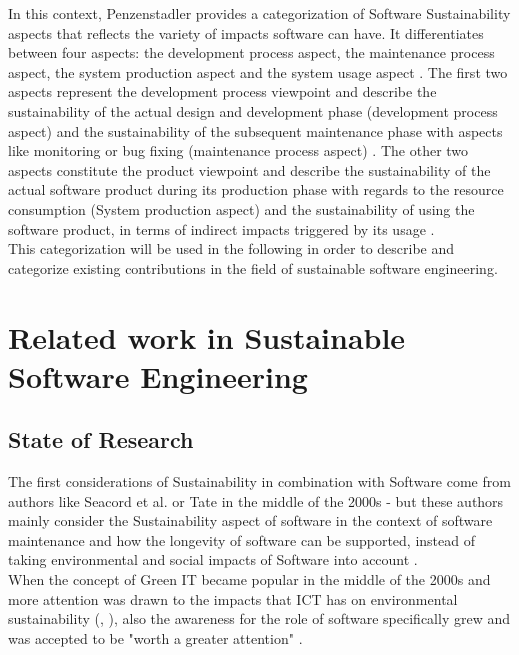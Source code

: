 \documentclass[oribibl]{llncs}
\begin{document}
In this context, Penzenstadler \cite{penzenstadler_supporting_2012} provides a categorization of Software Sustainability aspects that reflects the variety of impacts software can have. It differentiates between four aspects: the development process aspect, the maintenance process aspect, the system production aspect and the system usage aspect \cite{penzenstadler_supporting_2012}. The first two aspects represent the development process viewpoint and describe the sustainability of the actual design and development phase (development process aspect) and the sustainability of the subsequent maintenance phase with aspects like monitoring or bug fixing (maintenance process aspect) \cite{penzenstadler_sustainability_2012}. The other two aspects constitute the product viewpoint and describe the sustainability of the actual software product during its production phase with regards to the resource consumption (System production aspect) and the sustainability of using the software product, in terms of indirect impacts triggered by its usage \cite{penzenstadler_sustainability_2012}.\\ %
This categorization will be used in the following in order to describe and categorize existing contributions in the field of sustainable software engineering.


\section{Related work in Sustainable Software Engineering} 
\subsection{State of Research} The first considerations of Sustainability in combination with Software come from authors like Seacord et al. \cite{seacord_measuring_2003} or Tate \cite{tate_sustainable_2005} in the middle of the 2000s - but these authors mainly consider the Sustainability aspect of software in the context of software maintenance and how the longevity of software can be supported, instead of taking environmental and social impacts of Software into account \cite{albertao_measuring_2010}.\\ 
When the concept of Green IT became popular in the middle of the 2000s and more attention was drawn to the impacts that ICT has on environmental sustainability (\cite{berkhout_impacts_2001}, \cite{hilty_relevance_2006}), also the awareness for the role of software specifically grew and was accepted to be "worth a greater attention" \cite{capra_green_2009}.
\end{document}
